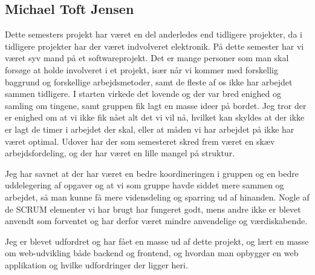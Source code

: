 \subsection*{Michael Toft Jensen}
Dette semesters projekt har været en del anderledes end tidligere projekter, da i tidligere projekter har der været indvolveret elektronik. På dette semester har vi været syv mand på et softwareprojekt. Det er mange personer som man skal forsøge at holde involveret i et projekt, især når vi kommer med forskellig baggrund og forskellige arbejdsmetoder, samt de fleste af os ikke har arbejdet sammen tidligere.
I starten virkede det lovende og der var bred enighed og samling om tingene, samt gruppen fik lagt en masse ideer på bordet. Jeg tror der er enighed om at vi ikke fik nået alt det vi vil nå, hvilket kan skyldes at der ikke er lagt de timer i arbejdet der skal, eller at måden vi har arbejdet på ikke har været optimal.
Udover har der som semesteret skred frem været en skæv arbejdsfordeling, og der har været en lille mangel på struktur.

Jeg har savnet at der har været en bedre koordineringen i gruppen og en bedre uddelegering af opgaver og at vi som gruppe havde siddet mere sammen og arbejdet, så man kunne få mere vidensdeling og sparring ud af hinanden. Nogle af de SCRUM elementer vi har brugt har fungeret godt, mens andre ikke er blevet anvendt som forventet og har derfor været mindre anvendelige og værdiskabende.

Jeg er blevet udfordret og har fået en masse ud af dette projekt, og lært en masse om web-udvikling både backend og frontend, og hvordan man opbygger en web applikation og hvilke udfordringer der ligger heri.